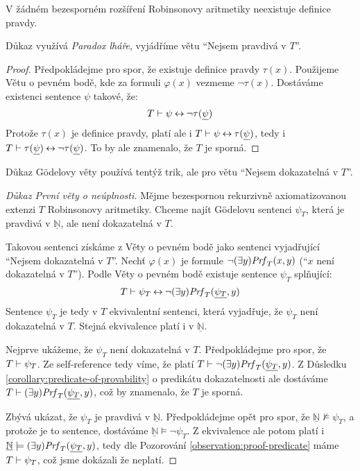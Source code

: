 \begin{theorem}
    V žádném bezesporném rozšíření Robinsonovy aritmetiky neexistuje definice pravdy.
\end{theorem}
Důkaz využívá \emph{Paradox lháře}, vyjádříme větu ``Nejsem pravdivá v $T$''.
\begin{proof}
Předpokládejme pro spor, že existuje definice pravdy $\tau(x)$.
Použijeme Větu o pevném bodě, kde za formuli $\varphi(x)$ vezmeme $\neg\tau(x)$. Dostáváme existenci sentence $\psi$ takové, že:
$$
T\vdash\psi\mathbin{\leftrightarrow}\neg\tau(\underline{\psi})
$$
Protože $\tau(x)$ je definice pravdy, platí ale i $T\vdash\psi\mathbin{\leftrightarrow}\tau(\underline{\psi})$, tedy i $T\vdash\tau(\underline{\psi})\mathbin{\leftrightarrow}\neg\tau(\underline{\psi})$. To by ale znamenalo, že $T$ je sporná.
\end{proof}

Důkaz Gödelovy věty používá tentýž trik, ale pro větu ``Nejsem dokazatelná v $T$''.

\begin{proof}[Důkaz První věty o neúplnosti]
Mějme bezespornou rekurzivně axiomatizovanou extenzi $T$ Robinsonovy aritmetiky. Chceme najít Gödelovu sentenci $\psi_T$, která je pravdivá v $\underline{\mathbb N}$, ale není dokazatelná v $T$.

Takovou sentenci získáme z Věty o pevném bodě jako sentenci vyjadřující ``Nejsem dokazatelná v $T$''. Nechť $\varphi(x)$ je formule $\neg(\exists y)\mathit{Prf}_T(x,y)$ (``$x$ není dokazatelná v $T$''). Podle Věty o pevném bodě existuje sentence $\psi_T$ splňující:
$$
T\vdash\psi_T\mathbin{\leftrightarrow}\neg(\exists y)\mathit{Prf}_T(\underline{\psi_T},y)
$$
Sentence $\psi_T$ je tedy v $T$ ekvivalentní sentenci, která vyjadřuje, že $\psi_T$ není dokazatelná v $T$. Stejná ekvivalence platí i v $\underline{\mathbb N}$. %

Nejprve ukážeme, že $\psi_T$ není dokazatelná v $T$. Předpokládejme pro spor, že $T\vdash\psi_T$. Ze self-reference tedy víme, že platí
$T\vdash\neg(\exists y)\mathit{Prf}_T(\underline{\psi_T},y)$.
Z Důsledku \ref{corollary:predicate-of-provability} o predikátu dokazatelnosti ale dostáváme $T\vdash (\exists y)\mathit{Prf}_T(\underline{\psi_T},y)$, což by znamenalo, že $T$ je sporná.

Zbývá ukázat, že $\psi_T$ je pravdivá v $\underline{\mathbb N}$. Předpokládejme opět pro spor, že $\underline{\mathbb N}\not\models\psi_T$, a protože je to sentence, dostáváme $\underline{\mathbb N}\models\neg\psi_T$. Z ekvivalence ale potom platí i 
$\underline{\mathbb N}\models(\exists y)\mathit{Prf}_T(\underline{\psi_T},y)$, tedy dle Pozorování \ref{observation:proof-predicate} máme $T\vdash\psi_T$, což jsme dokázali že neplatí.
\end{proof}


